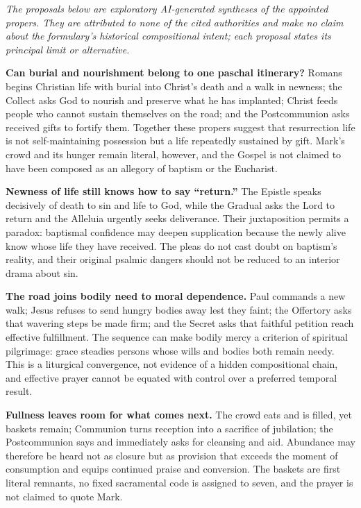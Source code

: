 \begin{deepstudy}
\noindent\emph{The proposals below are exploratory AI-generated syntheses of the appointed propers. They are attributed to none of the cited authorities and make no claim about the formulary's historical compositional intent; each proposal states its principal limit or alternative.}

\noindent\textbf{Can burial and nourishment belong to one paschal itinerary?\enspace{}}
Romans begins Christian life with burial into Christ's death and a walk in newness; the Collect asks God to nourish and preserve what he has implanted; Christ feeds people who cannot sustain themselves on the road; and the Postcommunion asks received gifts to fortify them. Together these propers suggest that resurrection life is not self-maintaining possession but a life repeatedly sustained by gift. Mark's crowd and its hunger remain literal, however, and the Gospel is not claimed to have been composed as an allegory of baptism or the Eucharist.

\noindent\textbf{Newness of life still knows how to say ``return.''\enspace{}}
The Epistle speaks decisively of death to sin and life to God, while the Gradual asks the Lord to return and the Alleluia urgently seeks deliverance. Their juxtaposition permits a paradox: baptismal confidence may deepen supplication because the newly alive know whose life they have received. The pleas do not cast doubt on baptism's reality, and their original psalmic dangers should not be reduced to an interior drama about sin.

\noindent\textbf{The road joins bodily need to moral dependence.\enspace{}}
Paul commands a new walk; Jesus refuses to send hungry bodies away lest they faint; the Offertory asks that wavering steps be made firm; and the Secret asks that faithful petition reach effective fulfillment. The sequence can make bodily mercy a criterion of spiritual pilgrimage: grace steadies persons whose wills and bodies both remain needy. This is a liturgical convergence, not evidence of a hidden compositional chain, and effective prayer cannot be equated with control over a preferred temporal result.

\noindent\textbf{Fullness leaves room for what comes next.\enspace{}}
The crowd eats and is filled, yet baskets remain; Communion turns reception into a sacrifice of jubilation; the Postcommunion says  and immediately asks for cleansing and aid. Abundance may therefore be heard not as closure but as provision that exceeds the moment of consumption and equips continued praise and conversion. The baskets are first literal remnants, no fixed sacramental code is assigned to seven, and the prayer is not claimed to quote Mark.


\end{deepstudy}
